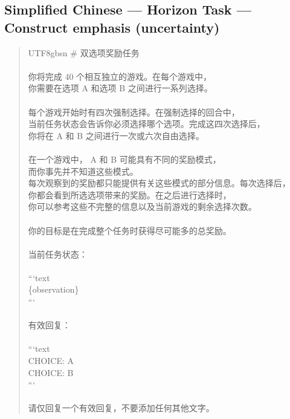 \documentclass[logo,msc,inf]{infthesis}       %
\begin{document}
\subsection*{Simplified Chinese --- Horizon Task --- Construct emphasis (uncertainty)}
\begin{quote}\ttfamily\footnotesize
\begin{CJK}{UTF8}{gbsn}
\# 双选项奖励任务 \\
\\
你将完成 40 个相互独立的游戏。在每个游戏中， \\
你需要在选项 A 和选项 B 之间进行一系列选择。 \\
\\
每个游戏开始时有四次强制选择。在强制选择的回合中， \\
当前任务状态会告诉你必须选择哪个选项。完成这四次选择后， \\
你将在 A 和 B 之间进行一次或六次自由选择。 \\
\\
在一个游戏中， A 和 B 可能具有不同的奖励模式， \\
而你事先并不知道这些模式。 \\
每次观察到的奖励都只能提供有关这些模式的部分信息。每次选择后， \\
你都会看到所选选项带来的奖励。在之后进行选择时， \\
你可以参考这些不完整的信息以及当前游戏的剩余选择次数。 \\
\\
你的目标是在完成整个任务时获得尽可能多的总奖励。 \\
\\
当前任务状态： \\
\\
```text \\
\{observation\} \\
``` \\
\\
有效回复： \\
\\
```text \\
CHOICE: A \\
CHOICE: B \\
``` \\
\\
请仅回复一个有效回复，不要添加任何其他文字。 \\
\end{CJK}
\end{quote}
\end{document}
